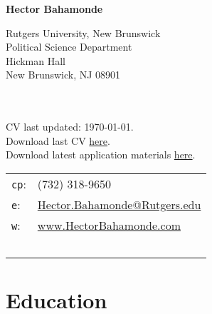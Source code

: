 \documentclass[letterpaper]{article}
\def\name{Hector Bahamonde}
\renewenvironment{itemize}{
  \begin{list}{}{
    \setlength{\leftmargin}{1.5em}
  }
}{
  \end{list}
}
\begin{document}

\centerline{\huge \bf \name}

\vspace{0.25in}

\begin{minipage}{0.45\linewidth}
  Rutgers University, New Brunswick \\
  Political Science Department \\
  Hickman Hall \\
  New Brunswick, NJ 08901\\
  \\
  \\
\begin{footnotesize}
 CV last updated: \today. \\
 Download last CV \href{http://github.com/hbahamonde/Job_Market/raw/master/Bahamonde_CV.pdf}{here}.\\
 Download latest application materials \href{http://www.hectorbahamonde.com}{here}.
\end{footnotesize}

\end{minipage}
\begin{minipage}{0.45\linewidth}
  \begin{tabular}{ll}
    \texttt{cp}: & (732) 318-9650 \\
    \texttt{e}: & \href{mailto:hector.bahamonde@rutgers.edu}{Hector.Bahamonde@Rutgers.edu} \\
    \texttt{w}: & \href{http://www.hectorbahamonde.com}{www.HectorBahamonde.com}
    \\
    \\
    \\
    \\
    \\
    \\
  \end{tabular}
\end{minipage}


%


\section*{Education}
\end{document}
